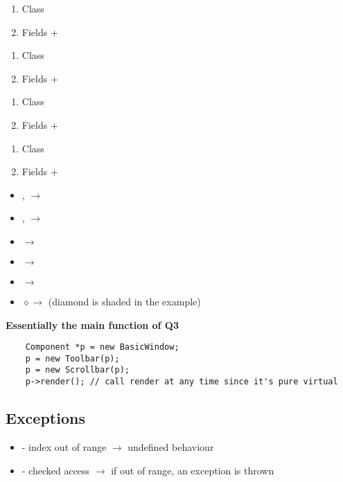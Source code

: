\begin{enumerate}[(1)]
    \item Class
          \subitem {}
    \item Fields
          \subitem +
\end{enumerate}

\begin{enumerate}[(1)]
    \item Class
          \subitem {}
    \item Fields
          \subitem +
\end{enumerate}

\begin{enumerate}[(1)]
    \item Class
          \subitem {}
    \item Fields
          \subitem +
\end{enumerate}

\begin{enumerate}[(1)]
    \item Class
          \subitem {}
    \item Fields
          \subitem +
\end{enumerate}

\begin{itemize}
    \item {},   $ \rightarrow $ 
    \item {},  $ \rightarrow $ 
    \item {} $ \rightarrow $ 
    \item {} $ \rightarrow $ 
    \item {} $ \rightarrow $ 
    \item {} $ \diamond \rightarrow $  (diamond
          is shaded in the  example)
\end{itemize}

\textbf{Essentially the main function of Q3}
\begin{lstlisting}
    Component *p = new BasicWindow;
    p = new Toolbar(p);
    p = new Scrollbar(p);
    p->render(); // call render at any time since it's pure virtual
\end{lstlisting}

\subsection{Exceptions}
\begin{itemize}
    \item {} - index out of range $ \rightarrow $ undefined behaviour
    \item {} - checked access $ \rightarrow $ if  out
    of range, an  exception is thrown
\end{itemize}


